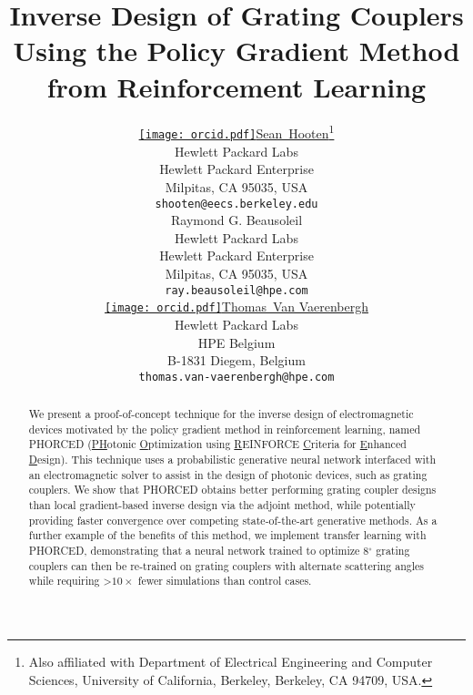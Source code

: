 \documentclass{article}
\title{Inverse Design of Grating Couplers Using the Policy Gradient Method from Reinforcement Learning}
\author{ \href{https://orcid.org/0000-0003-1260-412X}{\texttt{[image: orcid.pdf]}\hspace{1mm}Sean~Hooten}\thanks{Also affiliated with Department of Electrical Engineering and Computer Sciences, University of California, Berkeley, Berkeley, CA 94709, USA.}
		\\
	Hewlett Packard Labs \\
	Hewlett Packard Enterprise \\
	Milpitas, CA 95035, USA \\
	\texttt{shooten@eecs.berkeley.edu} \\
	\And
    Raymond G. Beausoleil \\
	Hewlett Packard Labs\\
	Hewlett Packard Enterprise \\
	Milpitas, CA 95035, USA \\
	\texttt{ray.beausoleil@hpe.com} \\
	\And
	\href{https://orcid.org/0000-0002-7301-8610}{\texttt{[image: orcid.pdf]}\hspace{1mm}Thomas~Van Vaerenbergh} \\
	Hewlett Packard Labs\\
	HPE Belgium\\
	B-1831 Diegem, Belgium \\
	\texttt{thomas.van-vaerenbergh@hpe.com}
}
\begin{document}
\maketitle



\begin{abstract}
We present a proof-of-concept technique for the inverse design of electromagnetic devices motivated by the policy gradient method in reinforcement learning, named PHORCED (\underline{PH}otonic \underline{O}ptimization using \underline{R}EINFORCE \underline{C}riteria for \underline{E}nhanced \underline{D}esign). This technique uses a probabilistic generative neural network interfaced with an electromagnetic solver to assist in the design of photonic devices, such as grating couplers. We show that PHORCED obtains better performing grating coupler designs than local gradient-based inverse design via the adjoint method, while potentially providing faster convergence over competing state-of-the-art generative methods. As a further example of the benefits of this method, we implement transfer learning with PHORCED, demonstrating that a neural network trained to optimize 8$^\circ$ grating couplers can then be re-trained on grating couplers with alternate scattering angles while requiring \textgreater$10\times$ fewer simulations than control cases.
\end{abstract}

\end{document}

